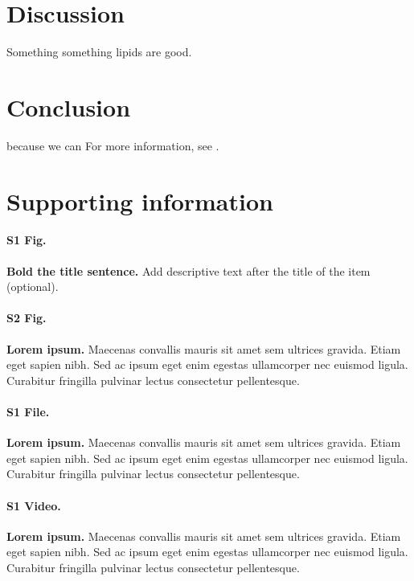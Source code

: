 \documentclass[10pt,letterpaper]{article}
\begin{document}





\section*{Discussion}
Something something lipids are good. 


\section*{Conclusion}

because we can For more information, see .

\section*{Supporting information}

\paragraph*{S1 Fig.}
\label{S1_Fig}
{\bf Bold the title sentence.} Add descriptive text after the title of the item (optional).

\paragraph*{S2 Fig.}
\label{S2_Fig}
{\bf Lorem ipsum.} Maecenas convallis mauris sit amet sem ultrices gravida. Etiam eget sapien nibh. Sed ac ipsum eget enim egestas ullamcorper nec euismod ligula. Curabitur fringilla pulvinar lectus consectetur pellentesque.

\paragraph*{S1 File.}
\label{S1_File}
{\bf Lorem ipsum.}  Maecenas convallis mauris sit amet sem ultrices gravida. Etiam eget sapien nibh. Sed ac ipsum eget enim egestas ullamcorper nec euismod ligula. Curabitur fringilla pulvinar lectus consectetur pellentesque.

\paragraph*{S1 Video.}
\label{S1_Video}
{\bf Lorem ipsum.}  Maecenas convallis mauris sit amet sem ultrices gravida. Etiam eget sapien nibh. Sed ac ipsum eget enim egestas ullamcorper nec euismod ligula. Curabitur fringilla pulvinar lectus consectetur pellentesque.
\end{document}
